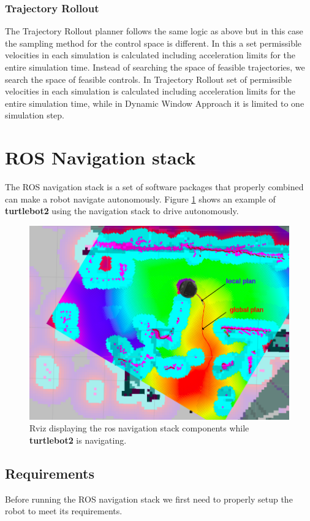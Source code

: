 \subsubsection{Trajectory Rollout} \label{tr}
The Trajectory Rollout planner follows the same logic as above but in this case the sampling method for the control space is different. In this a set permissible velocities
in each simulation is calculated including acceleration limits for the entire simulation time\cite{inbookdwa}. Instead of searching the space of feasible trajectories, we search the space of feasible controls. In Trajectory Rollout set of permissible velocities in each simulation is calculated including acceleration limits for the entire simulation
time, while in Dynamic Window Approach it is limited to one simulation step.

\section {ROS Navigation stack}
The ROS navigation stack is a set of software packages that properly combined can make a robot navigate autonomously.
Figure \ref{fig:plans} shows an example of \textbf{turtlebot2} using the navigation stack to drive autonomously.
\begin{figure}[!htb]
    \centering
    \includegraphics[scale=0.35]{imgs/chapter3/nav.png}
    \caption[Rviz view of the ROS Navigation Stack]{Rviz displaying the ros navigation stack components while \textbf{turtlebot2} is navigating.}
    \label{fig:plans}
\end{figure}

\subsection{Requirements}
 Before running the \ac{ROS} navigation stack we first need to properly setup the robot to meet its requirements.
